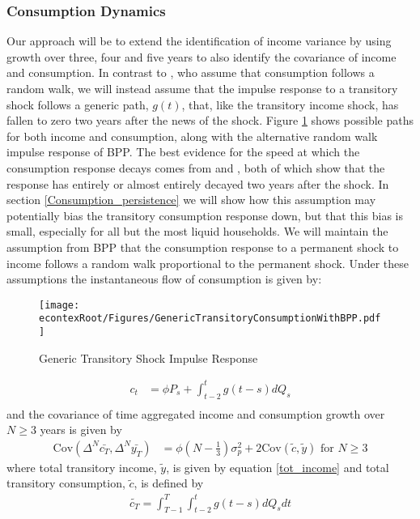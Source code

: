 \documentclass[titlepage]{\econtex}\newcommand{\texname}{ConsumptionHeterogeneity}
\begin{document}
\subsubsection{Consumption Dynamics} \label{cons_dynamics}
Our approach will be to extend the identification of income variance by using growth over three, four and five years to also identify the covariance of income and consumption. In contrast to \cite{blundell_consumption_2008}, who assume that consumption follows a random walk, we will instead assume that the impulse response to a transitory shock follows a generic path, $g(t)$, that, like the transitory income shock, has fallen to zero two years after the news of the shock. Figure \ref{fig:GenericTransitoryBPP} shows possible paths for both income and consumption, along with the alternative random walk impulse response of BPP. The best evidence for the speed at which the consumption response decays comes from \cite{gelman_what_2016} and \cite{fagereng_mpc_2016}, both of which show that the response has entirely or almost entirely decayed two years after the shock. In section \ref{Consumption_persistence} we will show how this assumption may potentially bias the transitory consumption response down, but that this bias is small, especially for all but the most liquid households. We will maintain the assumption from BPP that the consumption response to a permanent shock to income follows a random walk proportional to the permanent shock. Under these assumptions the instantaneous flow of consumption is given by:	\begin{figure} 
	\begin{centering}
		\texttt{[image: \\econtexRoot/Figures/GenericTransitoryConsumptionWithBPP.pdf]} 
		\caption{Generic Transitory Shock Impulse Response}
		\label{fig:GenericTransitoryBPP}
	\end{centering}
\end{figure}
\begin{align*}
c_t  &= \phi P_s  + \int_{t-2}^{t} g(t-s)dQ_s  \\
\end{align*}
and the covariance of time aggregated income and consumption growth over $N \geq 3$ years is given by
\begin{align}
\mathrm{Cov}(\Delta^N \bar{c_T},\Delta^N \bar{y_T} ) &= \phi (N-\frac{1}{3}) \sigma^2_p + 2 \mathrm{Cov}(\tilde{c},\tilde{y}) \text{  for  } N\geq 3 \label{covariance}
\end{align}
where total transitory income, $\tilde{y}$, is given by equation \ref{tot_income} and total transitory consumption, $\tilde{c}$, is defined by
\begin{align}
\tilde{c_T} = \int_{T-1}^{T}\int_{t-2}^{t} g(t-s)dQ_s dt \label{tot_cons}
\end{align}
\end{document}
